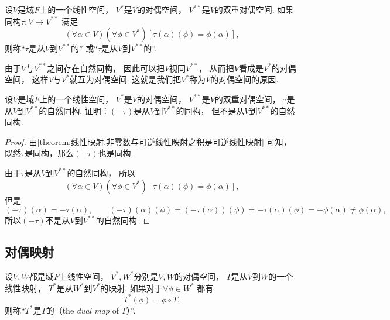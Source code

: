 \begin{definition}
设\(V\)是域\(F\)上的一个线性空间，
\(V^*\)是\(V\)的对偶空间，
\(V^{**}\)是\(V\)的双重对偶空间.
如果同构\(\tau\colon V \to V^{**}\)
满足\begin{equation*}
	(\forall \alpha \in V)
	(\forall \phi \in V^*)
	[
		\tau(\alpha)(\phi)
		= \phi(\alpha)
	],
\end{equation*}
则称“\(\tau\)是从\(V\)到\(V^{**}\)的”
或“\(\tau\)是从\(V\)到\(V^{**}\)的”.
\end{definition}

由于\(V\)与\(V^{**}\)之间存在自然同构，
因此可以把\(V\)视同\(V^{**}\)，
从而把\(V\)看成是\(V^*\)的对偶空间，
这样\(V\)与\(V^*\)就互为对偶空间.
这就是我们把\(V^*\)称为\(V\)的对偶空间的原因.

\begin{example}
设\(V\)是域\(F\)上的一个线性空间，
\(V^*\)是\(V\)的对偶空间，
\(V^{**}\)是\(V\)的双重对偶空间，
\(\tau\)是从\(V\)到\(V^{**}\)的自然同构.
证明：\((-\tau)\)是从\(V\)到\(V^{**}\)的同构，
但不是从\(V\)到\(V^{**}\)的自然同构.
\begin{proof}
由\cref{theorem:线性映射.非零数与可逆线性映射之积是可逆线性映射} 可知，
既然\(\tau\)是同构，那么\((-\tau)\)也是同构.

由于\(\tau\)是从\(V\)到\(V^{**}\)的自然同构，
所以\begin{equation*}
	(\forall \alpha \in V)
	(\forall \phi \in V^*)
	[
		\tau(\alpha)(\phi)
		= \phi(\alpha)
	],
\end{equation*}
但是\begin{equation*}
	(-\tau)(\alpha)
	= -\tau(\alpha),
	\qquad
	(-\tau)(\alpha)(\phi)
	= (-\tau(\alpha))(\phi)
	= -\tau(\alpha)(\phi)
	= -\phi(\alpha)
	\neq \phi(\alpha),
\end{equation*}
所以\((-\tau)\)不是从\(V\)到\(V^{**}\)的自然同构.
\end{proof}
\end{example}

\subsection{对偶映射}
\begin{definition}
设\(V,W\)都是域\(F\)上线性空间，
\(V^*,W^*\)分别是\(V,W\)的对偶空间，
\(T\)是从\(V\)到\(W\)的一个线性映射，
\(T^*\)是从\(W^*\)到\(V^*\)的映射.
如果对于\(\forall \phi \in W^*\)
都有\begin{equation*}
	T^*(\phi) = \phi \circ T,
\end{equation*}
则称“\(T^*\)是\(T\)的（the \emph{dual map} of \(T\)）”.
\end{definition}

